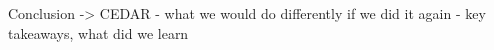 Conclusion -> CEDAR
  - what we would do differently if we did it again
  - key takeaways, what did we learn
